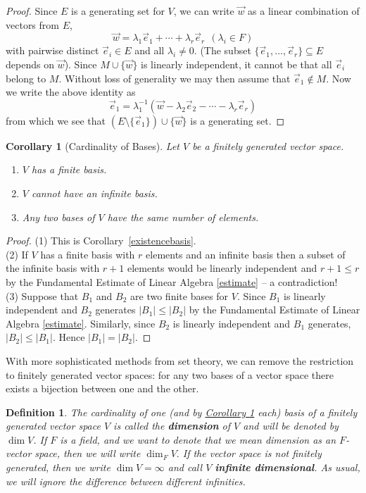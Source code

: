 \documentclass[11pt]{amsbook}
\newtheorem{definition}[theorem]{Definition}
\newtheorem{corollary}[theorem]{Corollary}
\theoremstyle{definition}
\begin{document}
\begin{proof}
Since $E$ is a generating set for $V$, we can write $\vec{w}$ as a linear combination of vectors from $E$,
$$\vec{w} = \lambda_1 \vec{e}_1 + \cdots + \lambda_r \vec{e}_r~~(\lambda_i\in F)$$
with pairwise distinct $\vec{e}_i\in E$ and all $\lambda_i \neq 0$. (The subset $\{\vec{e}_1,\dots,\vec{e}_r\} \subseteq E$ depends on $\vec{w}$). Since $M\cup \{ \vec{w} \}$ is linearly independent, it cannot be that all $\vec{e}_i$ belong to $M$. Without loss of generality we may then assume that $\vec{e}_1\notin M$. Now we write the above identity as $$\vec{e}_1 = \lambda_1^{-1}(\vec{w} - \lambda_2 \vec{e}_2 - \cdots - \lambda_r\vec{e}_r)$$ from which we see that $(E\setminus \{ \vec{e}_1\}) \cup \{ \vec{w} \}$ is a generating set.
\end{proof}


\begin{corollary}[Cardinality of Bases] \label{card}
Let $V$ be a finitely generated vector space.
\begin{enumerate}
\item $V$ has a finite basis.
\item $V$ cannot have an infinite basis.
\item Any two bases of $V$ have the same number of elements.
\end{enumerate}
\end{corollary}
\begin{proof} 
(1) This is Corollary~\ref{existencebasis}.\\
(2) If $V$ has a finite basis with $r$ elements and an infinite basis then a subset of the infinite basis with $r+1$ elements would be linearly independent
and $r+1 \leqslant r$ by the Fundamental Estimate of Linear Algebra  \ref{estimate} -- a contradiction! \\
(3) 
Suppose that $B_1$ and $B_2$ are two finite bases for $V$.  Since $B_1$ is linearly independent and $B_2$ generates  
$|B_1|\leqslant |B_2|$
by the Fundamental Estimate of Linear Algebra  \ref{estimate}.
Similarly, since $B_2$ is linearly independent and $B_1$ generates, $|B_2|\leqslant |B_1|$. 
Hence $|B_1|=|B_2|$.
\end{proof}

With more sophisticated methods from set theory, we can remove the restriction to finitely generated vector spaces: for any two bases of a vector space there exists a bijection between one and the other.

\begin{definition} The cardinality of one (and by \hyperref[card]{Corollary \ref{card}} each) basis of a finitely generated vector space $V$ is called the {\bf dimension} of $V$ and will be denoted by $\dim V$. If $F$ is a field, and we want to denote that we mean dimension as an $F$-vector space, then we will write $ \dim_F V.$ If the vector space is not finitely generated, then we write $\dim V =\infty$ and call $V$ {\bf infinite dimensional}. As usual, we will ignore the difference between different infinities.
\end{definition}
\end{document}
